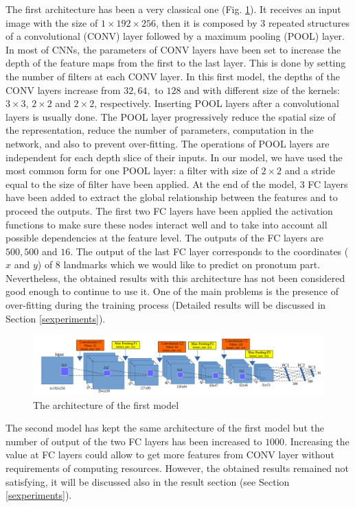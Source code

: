 \documentclass[review]{elsarticle}
\begin{document}
The first architecture has been a very classical one (Fig. \ref{fignet1}). It receives an input image with the size of $1 \times 192 \times 256$, then it is composed by $3$ repeated structures of a convolutional (CONV) layer followed by a maximum pooling (POOL) layer. In most of CNNs, the parameters of CONV layers have been set to increase the depth of the feature maps from the first  to the last layer. This is done by setting the number of filters at each CONV layer. In this first model, the depths of the CONV layers increase from $32, 64, $ to $128$ and with different size of the kernels: $3 \times 3$, $2 \times 2$ and $2 \times 2$, respectively. Inserting POOL layers after a convolutional layers is usually done. The POOL layer progressively reduce the spatial size of the representation, reduce the number of parameters, computation in the network, and also to prevent over-fitting. The operations of POOL layers are independent for each depth slice of their inputs. In our model, we have used the most common form for one POOL layer: a filter with size of $2 \times 2$ and a stride equal to the size of filter have been applied. At the end of the model, $3$ FC layers have been added to extract the global relationship between the features and to proceed the outputs. The first two FC layers have been applied the activation functions to make sure these nodes interact well and to take into account all possible dependencies at the feature level. The outputs of the FC layers are $500, 500$ and $16$. The output of the last FC layer corresponds to the coordinates ($x$ and $y$) of $8$ landmarks which we would like to predict on pronotum part. Nevertheless, the obtained results with this architecture has not been considered good enough to continue to use it. One of the main problems is the presence of over-fitting during the training process (Detailed results will be discussed in Section \ref{sexperiments}).
\begin{figure}[!h]
	\centering
	\includegraphics[scale=0.3]{images/net1}
	\caption{The architecture of the first model}
	\label{fignet1}
\end{figure}

The second model has kept the same architecture of the first model but the number of output of the two FC layers has been increased to $1000$. Increasing the value at FC layers could allow to get more features from CONV layer without requirements of computing resources. However, the obtained results remained not satisfying, it will be discussed also in the result section (see Section \ref{sexperiments}). 
\end{document}

